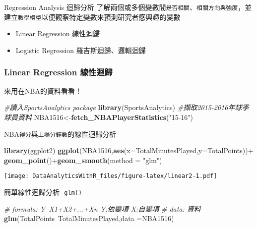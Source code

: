 \documentclass[]{book}
\newenvironment{Shaded}{\begin{snugshade}}{\end{snugshade}}
\newcommand{\KeywordTok}[1]{\textcolor[rgb]{0.13,0.29,0.53}{\textbf{{#1}}}}
\newcommand{\DataTypeTok}[1]{\textcolor[rgb]{0.13,0.29,0.53}{{#1}}}
\newcommand{\StringTok}[1]{\textcolor[rgb]{0.31,0.60,0.02}{{#1}}}
\newcommand{\CommentTok}[1]{\textcolor[rgb]{0.56,0.35,0.01}{\textit{{#1}}}}
\newcommand{\NormalTok}[1]{{#1}}
\providecommand{\tightlist}{%
  \setlength{\itemsep}{0pt}\setlength{\parskip}{0pt}}
\begin{document}
Regression Analysis 迴歸分析
了解兩個或多個變數間\texttt{是否相關}、\texttt{相關方向與強度}，並建立\texttt{數學模型}以便觀察特定變數來預測研究者感興趣的變數

\begin{itemize}
\tightlist
\item
  Linear Regression 線性迴歸
\item
  Logistic Regression 羅吉斯迴歸、邏輯迴歸
\end{itemize}

\subsubsection{Linear Regression 線性迴歸}\label{linear-regression-}

來用在NBA的資料看看！

\begin{Shaded}
\begin{Highlighting}[]
\CommentTok{#讀入SportsAnalytics package}
\KeywordTok{library}\NormalTok{(SportsAnalytics)}
\CommentTok{#擷取2015-2016年球季球員資料}
\NormalTok{NBA1516<-}\KeywordTok{fetch_NBAPlayerStatistics}\NormalTok{(}\StringTok{"15-16"}\NormalTok{)}
\end{Highlighting}
\end{Shaded}

NBA\texttt{得分}與\texttt{上場分鐘數}的線性迴歸分析

\begin{Shaded}
\begin{Highlighting}[]
\KeywordTok{library}\NormalTok{(ggplot2)}
\KeywordTok{ggplot}\NormalTok{(NBA1516,}\KeywordTok{aes}\NormalTok{(}\DataTypeTok{x=}\NormalTok{TotalMinutesPlayed,}\DataTypeTok{y=}\NormalTok{TotalPoints))+}
\StringTok{    }\KeywordTok{geom_point}\NormalTok{()+}\KeywordTok{geom_smooth}\NormalTok{(}\DataTypeTok{method =} \StringTok{"glm"}\NormalTok{)}
\end{Highlighting}
\end{Shaded}

\texttt{[image: DataAnalyticsWithR\_files/figure-latex/linear2-1.pdf]}

簡單線性迴歸分析- \texttt{glm()}

\begin{Shaded}
\begin{Highlighting}[]
\CommentTok{# formula: Y~X1+X2+...+Xn  Y:依變項 X:自變項}
\CommentTok{# data: 資料}
\KeywordTok{glm}\NormalTok{(TotalPoints~TotalMinutesPlayed,}\DataTypeTok{data =}\NormalTok{NBA1516)}
\end{Highlighting}
\end{Shaded}
\end{document}

